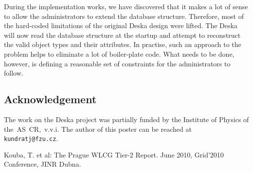 \documentclass[11pt]{article}
\begin{document}
During the implementation works, we have discovered that it makes a lot of sense
to allow the administrators to extend the database structure.  Therefore, most
of the hard-coded limitations of the original Deska design were lifted.  The
Deska will now read the database structure at the startup and attempt to
reconstruct the valid object types and their attributes.  In practise, such an
approach to the problem helps to eliminate a lot of boiler-plate code.  What
needs to be done, however, is defining a reasonable set of constraints for the
administrators to follow.


\subsection{Acknowledgement}

The work on the Deska project was partially funded by the Institute of Physics
of the~AS~CR,~v.v.i.  The author of this poster can be reached at {\tt
kundratj@fzu.cz}.

\begin{thebibliography}{9}
    Kouba, T. et al: The Prague WLCG Tier-2 Report.
        June 2010, Grid'2010 Conference, JINR Dubna.
\end{thebibliography}
\end{document}
